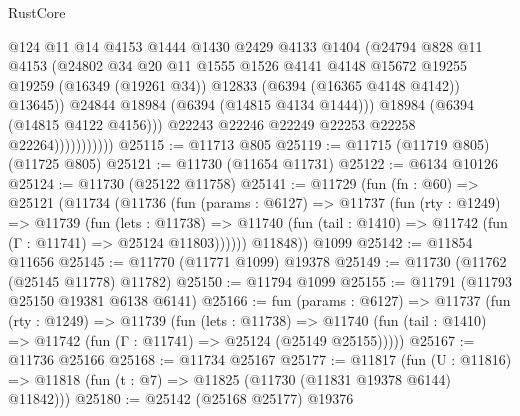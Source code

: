\begin{lexlean}{RustCore}
\begin{coremodule}
                              @124
                              @11
                              @14
                              @4153
                              @1444
                              @1430
                              @2429
                              @4133
                              @1404
                              (@24794
                                @828
                                @11
                                @4153
                                (@24802
                                  @34
                                  @20
                                  @11
                                  @1555
                                  @1526
                                  @4141
                                  @4148
                                  @15672
                                  @19255
                                  @19259
                                  (@16349 (@19261 @34))
                                  @12833
                                  (@6394 (@16365 @4148 @4142))
                                  @13645))
                              @24844
                              @18984
                              (@6394 (@14815 @4134 @1444)))
                            @18984
                            (@6394 (@14815 @4122 @4156)))
                          @22243
                          @22246
                          @22249
                          @22253
                          @22258
                          @22264)))))))))))
@25115 := @11713 @805
@25119 := @11715 (@11719 @805) (@11725 @805)
@25121 := @11730 (@11654 @11731)
@25122 := @6134 @10126
@25124 := @11730 (@25122 @11758)
@25141 := @11729
    (fun (fn : @60) =>
    @25121
      (@11734
        (@11736
          (fun (params : @6127) =>
          @11737
            (fun (rty : @1249) =>
            @11739
              (fun (lets : @11738) =>
              @11740 (fun (tail : @1410) => @11742 (fun (Γ : @11741) => @25124 @11803))))))
        @11848))
    @1099
@25142 := @11854 @11656
@25145 := @11770 (@11771 @1099) @19378
@25149 := @11730 (@11762 (@25145 @11778) @11782)
@25150 := @11794 @1099
@25155 := @11791 (@11793 @25150 @19381 @6138 @6141)
@25166 := fun (params : @6127) =>
  @11737
    (fun (rty : @1249) =>
    @11739
      (fun (lets : @11738) =>
      @11740 (fun (tail : @1410) => @11742 (fun (Γ : @11741) => @25124 (@25149 @25155)))))
@25167 := @11736 @25166
@25168 := @11734 @25167
@25177 := @11817
    (fun (U : @11816) => @11818 (fun (t : @7) => @11825 (@11730 (@11831 @19378 @6144) @11842)))
@25180 := @25142 (@25168 @25177) @19376

\end{coremodule}
\end{lexlean}
